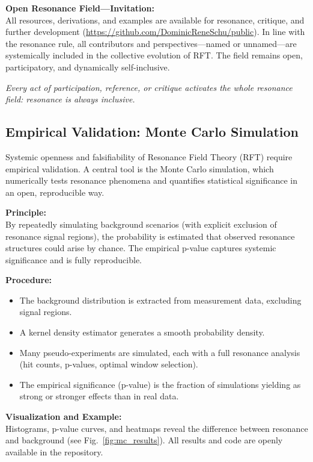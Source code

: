 \documentclass[12pt]{article}
\begin{document}
\medskip

\textbf{Open Resonance Field—Invitation:}\\
All resources, derivations, and examples are available for resonance, critique, and further development (\url{https://github.com/DominicReneSchu/public}). In line with the resonance rule, all contributors and perspectives—named or unnamed—are systemically included in the collective evolution of RFT. The field remains open, participatory, and dynamically self-inclusive.

\medskip

\textit{Every act of participation, reference, or critique activates the whole resonance field: resonance is always inclusive.}

\subsection{Empirical Validation: Monte Carlo Simulation}
\label{sec:monte_carlo}

Systemic openness and falsifiability of Resonance Field Theory (RFT) require empirical validation. A central tool is the Monte Carlo simulation, which numerically tests resonance phenomena and quantifies statistical significance in an open, reproducible way.

\textbf{Principle:}\\
By repeatedly simulating background scenarios (with explicit exclusion of resonance signal regions), the probability is estimated that observed resonance structures could arise by chance. The empirical p-value captures systemic significance and is fully reproducible.

\textbf{Procedure:}
\begin{itemize}
	\item The background distribution is extracted from measurement data, excluding signal regions.
	\item A kernel density estimator generates a smooth probability density.
	\item Many pseudo-experiments are simulated, each with a full resonance analysis (hit counts, p-values, optimal window selection).
	\item The empirical significance (p-value) is the fraction of simulations yielding as strong or stronger effects than in real data.
\end{itemize}

\textbf{Visualization and Example:}\\
Histograms, p-value curves, and heatmaps reveal the difference between resonance and background (see Fig.~\ref{fig:mc_results}). All results and code are openly available in the repository.
\end{document}
